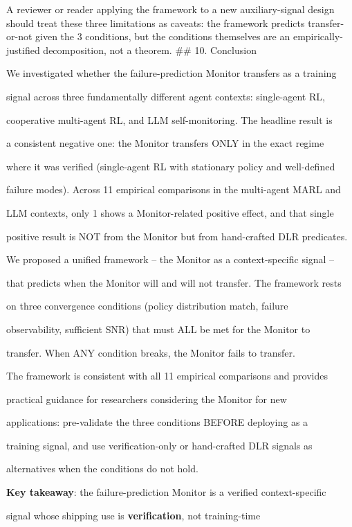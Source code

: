 \documentclass[
]{article}
\begin{document}
A reviewer or reader applying the framework to a new auxiliary-signal
design should treat these three limitations as caveats: the framework
predicts transfer-or-not given the 3 conditions, but the conditions
themselves are an empirically-justified decomposition, not a theorem.
\#\# 10. Conclusion

We investigated whether the failure-prediction Monitor transfers as a
training

signal across three fundamentally different agent contexts: single-agent
RL,

cooperative multi-agent RL, and LLM self-monitoring. The headline result
is

a consistent negative one: the Monitor transfers ONLY in the exact
regime

where it was verified (single-agent RL with stationary policy and
well-defined

failure modes). Across 11 empirical comparisons in the multi-agent MARL
and

LLM contexts, only 1 shows a Monitor-related positive effect, and that
single

positive result is NOT from the Monitor but from hand-crafted DLR
predicates.

We proposed a unified framework -- the Monitor as a context-specific
signal --

that predicts when the Monitor will and will not transfer. The framework
rests

on three convergence conditions (policy distribution match, failure

observability, sufficient SNR) that must ALL be met for the Monitor to

transfer. When ANY condition breaks, the Monitor fails to transfer.

The framework is consistent with all 11 empirical comparisons and
provides

practical guidance for researchers considering the Monitor for new

applications: pre-validate the three conditions BEFORE deploying as a

training signal, and use verification-only or hand-crafted DLR signals
as

alternatives when the conditions do not hold.

\textbf{Key takeaway}: the failure-prediction Monitor is a verified
context-specific

signal whose shipping use is \textbf{verification}, not training-time
\end{document}
